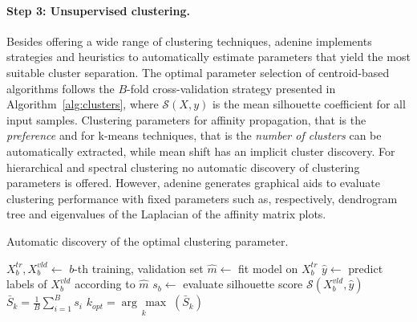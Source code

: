 \documentclass[twoside,11pt]{article}
\makeatletter
\newcommand{\argmax}[1]{\underset{#1}{\operatorname{arg}\,\operatorname{max}}\;}
\newcommand{\ade}{{\sc adenine}\@\xspace}
\makeatother
\begin{document}
\paragraph{Step 3: Unsupervised clustering.}   %
  Besides offering a wide range of clustering techniques,
  \ade implements strategies and heuristics to automatically estimate parameters that yield the most suitable cluster separation. 
  The optimal parameter selection of centroid-based algorithms follows the $B$-fold cross-validation strategy presented in Algorithm~\ref{alg:clusters}, where $\mathcal{S}(X,y)$ is the mean silhouette coefficient \citep{rousseeuw1987silhouettes} for all input samples.
  Clustering parameters for affinity propagation, that is the \emph{preference} \citep{frey2007clustering} and for k-means techniques, that is the \emph{number of clusters} \citep{bishop2006pattern} can be automatically extracted, while mean shift \citep{comaniciu2002mean} has an implicit cluster discovery.
  For hierarchical \citep{friedman2001elements} and spectral clustering \citep{shi2000normalized} no automatic discovery of clustering parameters is offered. However, \ade generates graphical aids to evaluate clustering performance with fixed parameters such as, respectively, dendrogram tree and eigenvalues of the Laplacian of the affinity matrix plots.
  
  
 
\begin{algorithm}
\caption{Automatic discovery of the optimal clustering parameter.}\label{alg:clusters}
\label{alg:clusters}
\begin{algorithmic}[1]
                \State $X^{tr}_b,X^{vld}_b\leftarrow$ $b$-th training, validation set
                \State $\hat{m}\leftarrow$ fit model on $X^{tr}_b$
                \State $\hat{y}\leftarrow$ predict labels of $X^{vld}_b$ according to $\hat{m}$
                \State $s_b\leftarrow$ evaluate silhouette score  $\mathcal{S}(X^{vld}_b,\hat{y})$
	\EndFor    
	\State $\bar{S}_k = \frac{1}{B}\sum_{i=1}^B s_i$
\EndFor
\State $k_{opt} = \argmax{k}(\bar{S}_k)$
\end{algorithmic}
\end{algorithm}
\end{document}
